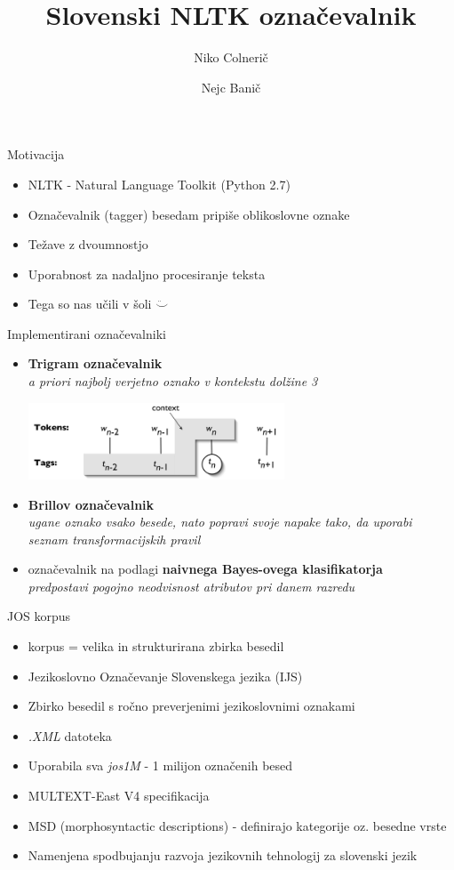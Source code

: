 \documentclass{beamer}
\title[Slovenski NLTK označevalnik]{Slovenski NLTK označevalnik}
\author{
	Niko Colnerič
	\and
	Nejc Banič}
\institute{ Fakulteta za Računalništvo in Informtiko\\
			Univerza v Ljubljani}
\begin{document}
\begin{frame}
\titlepage
\end{frame}

\begin{frame}{Motivacija}
\begin{itemize}
\item NLTK - Natural Language Toolkit (Python 2.7)
\item Označevalnik (tagger) besedam pripiše oblikoslovne oznake
\item Težave z dvoumnostjo
\item Uporabnost za nadaljno procesiranje teksta
\item Tega so nas učili v šoli $\ddot\smile$
\end{itemize}
\end{frame}

\begin{frame}{Implementirani označevalniki}
\begin{itemize}
\item \textbf{Trigram označevalnik}\\
\textit{a priori najbolj verjetno oznako v kontekstu dolžine 3}
\begin{center}
\includegraphics[width=0.6\textwidth]{../paper/tag-context.png}
\end{center}

\item \textbf{Brillov označevalnik}\\
\textit{ugane oznako vsako besede, nato 
popravi svoje napake tako, da uporabi seznam transformacijskih pravil}
\item označevalnik na podlagi \textbf{naivnega Bayes-ovega klasifikatorja}\\
\textit{predpostavi pogojno neodvisnost atributov pri danem razredu}
\end{itemize}
\end{frame}

\begin{frame}{JOS korpus}
\begin{itemize}
\item korpus = velika in strukturirana zbirka besedil
\item Jezikoslovno Označevanje Slovenskega jezika (IJS)
\item Zbirko besedil s ročno preverjenimi jezikoslovnimi oznakami
\item \textit{.XML} datoteka
\item Uporabila sva \textit{jos1M} - 1 milijon označenih besed
\item MULTEXT-East V4 specifikacija
\item MSD (morphosyntactic descriptions) - definirajo kategorije oz. besedne vrste
\item Namenjena spodbujanju razvoja jezikovnih tehnologij za slovenski jezik
\end{itemize}
\end{frame}
\end{document}
